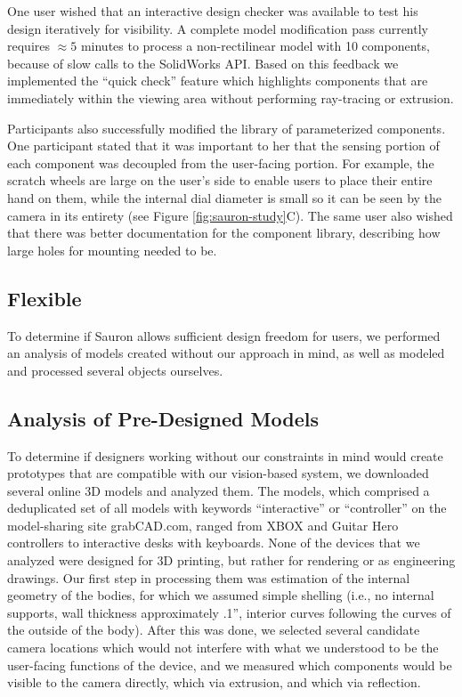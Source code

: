     One user wished that an interactive design checker was available to test his design iteratively for visibility. A complete model modification pass currently requires $\approx 5$ minutes to process a non-rectilinear model with 10 components, because of slow calls to the SolidWorks API. Based on this feedback we implemented the ``quick check'' feature which highlights components that are immediately within the viewing area without performing ray-tracing or extrusion.

    Participants also successfully modified the library of parameterized components. One participant stated that it was important to her that the sensing portion of each component was decoupled from the user-facing portion. For example, the scratch wheels are large on the user's side to enable users to place their entire hand on them, while the internal dial diameter is small so it can be seen by the camera in its entirety (see Figure \ref{fig:sauron-study}C). The same user also wished that there was better documentation for the component library, describing how large holes for mounting needed to be.


    \subsection{Flexible}
    
    To determine if Sauron allows sufficient design freedom for users, we performed an analysis of models created without our approach in mind, as well as modeled and processed several objects ourselves.
    
    \subsection{Analysis of Pre-Designed Models}
    To determine if designers working without our constraints in mind would create prototypes that are compatible with our vision-based system, we downloaded several online 3D models and analyzed them. The models, which comprised a deduplicated set of all models with keywords ``interactive'' or ``controller'' on the model-sharing site grabCAD.com, ranged from XBOX and Guitar Hero controllers to interactive desks with keyboards. None of the devices that we analyzed were designed for 3D printing, but rather for rendering or as engineering drawings. Our first step in processing them was estimation of the internal geometry of the bodies, for which we assumed simple shelling (i.e., no internal supports, wall thickness approximately .1'', interior curves following the curves of the outside of the body). After this was done, we selected several candidate camera locations which would not interfere with what we understood to be the user-facing functions of the device, and we measured which components would be visible to the camera directly, which via extrusion, and which via reflection. 

